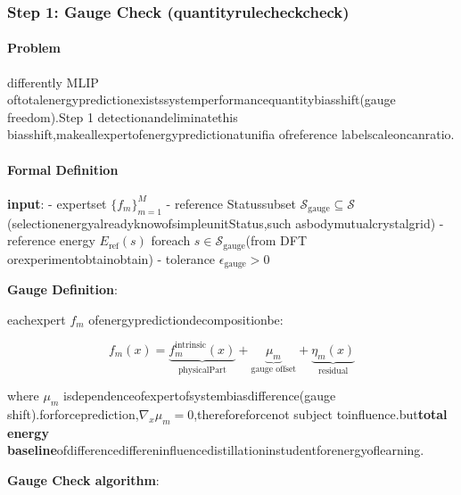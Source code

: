 \documentclass[
  12pt,
]{article}
\begin{document}
\subsubsection{Step 1: Gauge Check
(quantityrulecheckcheck)}\label{step-1-gauge-check-ux91cfux89c4ux68c0ux67e5}

\paragraph{Problem}\label{ux95eeux9898}

differently MLIP oftotalenergypredictionexistssystemperformancequantitybiasshift(gauge freedom).Step 1
detectionandeliminatethis biasshift,makeallexpertofenergypredictionatunifia ofreference labelscaleoncanratio.

\paragraph{Formal Definition}\label{ux5f62ux5f0fux5316ux5b9aux4e49}

\textbf{input}: - expertset \(\{f_m\}_{m=1}^M\) - reference Statussubset
\(\mathcal{S}_{\text{gauge}} \subseteq \mathcal{S}\)(selectionenergyalreadyknowofsimpleunitStatus,such asbodymutualcrystalgrid)
- reference energy \(E_{\text{ref}}(s)\) foreach
\(s \in \mathcal{S}_{\text{gauge}}\)(from DFT orexperimentobtainobtain) - tolerance
\(\epsilon_{\text{gauge}} > 0\)

\textbf{Gauge Definition}:

eachexpert \(f_m\) ofenergypredictiondecompositionbe:

\[f_m(x) = \underbrace{f_m^{\text{intrinsic}}(x)}_{\text{physicalPart}} + \underbrace{\mu_m}_{\text{gauge offset}} + \underbrace{\eta_m(x)}_{\text{residual}}\]

where \(\mu_m\) isdependenceofexpertofsystembiasdifference(gauge
shift).forforceprediction,\(\nabla_x \mu_m = 0\),thereforeforcenot subject toinfluence.but\textbf{total energy baseline}ofdifferencediffereninfluencedistillationinstudentforenergyoflearning.

\textbf{Gauge Check algorithm}:
\end{document}
